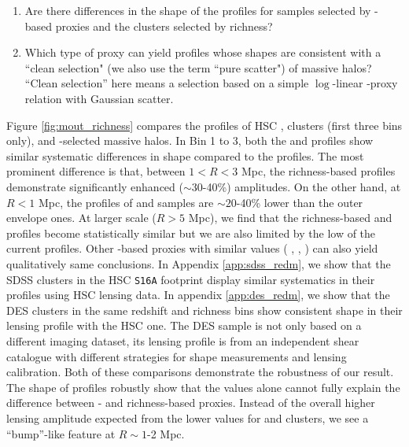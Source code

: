\documentclass[fleqn,usenatbib,useAMS]{mnras}
\begin{document}
\begin{CJK*}{UTF8}{gbsn}
\begin{enumerate}
        \item Are there differences in the shape of the \dsigma{} profiles for samples selected by
            \mstar{}-based \mvir{} proxies and the clusters selected by richness?

        \item Which type of \mvir{} proxy can yield \dsigma{} profiles whose shapes are consistent
            with a ``clean selection" (we also use the term ``pure scatter") of massive halos? 
            ``Clean selection'' here means a selection based on a simple $\log$-linear \mvir{}-proxy 
            relation with Gaussian scatter.

    \end{enumerate}

    Figure \ref{fig:mout_richness} compares the \dsigma{} profiles of HSC \redm{}, \camira{}
    clusters (first three bins only), and -selected massive halos.
    In Bin 1 to 3, both the \redm{} and \camira{} \dsigma{} profiles show similar systematic
    differences in shape compared to the  profiles.
    The most prominent difference is that, between $1 < R < 3$ Mpc, the richness-based \dsigma{}
    profiles demonstrate significantly enhanced ($\sim 30$-40\%) \dsigma{} amplitudes.
    On the other hand, at $R < 1$ Mpc, the \dsigma{} profiles of \redm{} and \camira{} samples
    are $\sim 20$-40\% lower than the outer envelope \mstar{} ones.
    At larger scale ($R > 5$ Mpc), we find that the richness-based and  \dsigma{}
    profiles become statistically similar but we are also limited by the low \snratio{} of the
    current profiles.
    Other \mstar{}-based proxies with similar \sigmvir{} values (\eg{} , \masap{},
    ) can also yield qualitatively same conclusions.
    In Appendix \ref{app:sdss_redm}, we show that the SDSS \redm{} clusters in the HSC
    \texttt{S16A} footprint display similar systematics in their \dsigma{} profiles using HSC
    lensing data. 
    In appendix \ref{app:des_redm}, we show that the DES \redm{} clusters in the same 
    redshift and richness bins show consistent shape in their lensing profile with the HSC one.
    The DES sample is not only based on a different imaging dataset, its lensing profile 
    is from an independent shear catalogue with different strategies for shape measurements and 
    lensing calibration.
    Both of these comparisons demonstrate the robustness of our result.
    The shape of \dsigma{} profiles robustly show that the \sigmvir{} values alone cannot fully
    explain the difference between \mstar{}- and richness-based \mvir{} proxies.
    Instead of the overall higher lensing amplitude expected from the lower \sigmvir{} values
    for \redm{} and \camira{} clusters, we see a ``bump''-like feature at $R \sim 1$-2 Mpc.


\end{CJK*}
\end{document}
